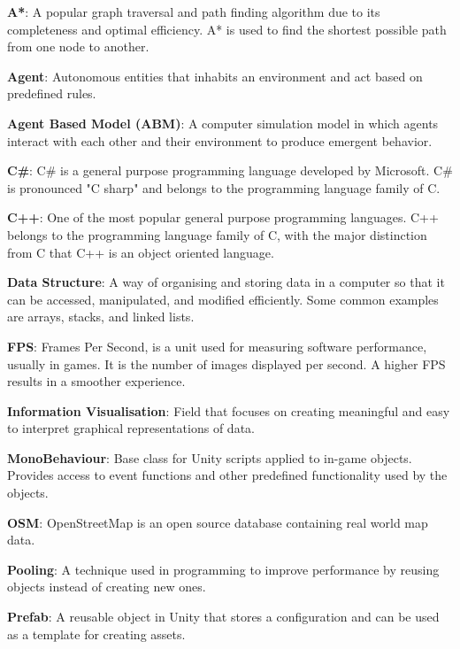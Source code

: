 \noindent
\label{itm:a*}\textbf{A*}: A popular graph traversal and path finding algorithm due to its completeness and optimal efficiency. A* is used to find the shortest possible path from one node to another.

\noindent
\label{itm:agent}\textbf{Agent}: Autonomous entities that inhabits an environment and act based on predefined rules.

\noindent
\label{itm:abm}\textbf{Agent Based Model (ABM)}: A computer simulation model in which agents interact with each other and their environment to produce emergent behavior. 

\noindent
\label{itm:csharp}\textbf{C\#}: C\# is a general purpose programming language developed by Microsoft. C\# is pronounced "C sharp" and belongs to the programming language family of C.

\noindent
\label{itm:c++}\textbf{C++}: One of the most popular general purpose programming languages. C++ belongs to the programming language family of C, with the major distinction from C that C++ is an object oriented language.

\noindent
\label{itm:data-structure}\textbf{Data Structure}: A way of organising and storing data in a computer so that it can be accessed, manipulated, and modified efficiently. Some common examples are arrays, stacks, and linked lists.

\noindent
\label{itm:fps}\textbf{FPS}: Frames Per Second, is a unit used for measuring software performance, usually in games. It is the number of images displayed per second. A higher FPS results in a smoother experience.

\noindent
\label{itm:information-visualization}\textbf{Information Visualisation}: Field that focuses on creating meaningful and easy to interpret graphical representations of data.

\noindent
\label{itm:monobehaviour}\textbf{MonoBehaviour}: Base class for Unity scripts applied to in-game objects. Provides access to event functions and other predefined functionality used by the objects.

\noindent
\label{itm:open-street-map}\textbf{OSM}: OpenStreetMap is an open source database containing real world map data.

\noindent
\label{itm:pooling}\textbf{Pooling}: A technique used in programming to improve performance by reusing objects instead of creating new ones. 

\noindent
\label{itm:prefab}\textbf{Prefab}: A reusable object in Unity that stores a configuration and can be used as a template for creating assets.

